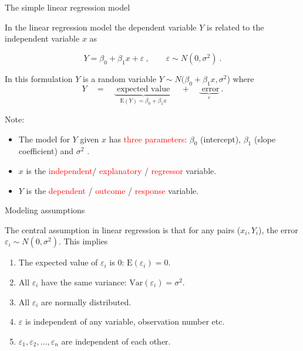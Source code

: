 \documentclass[10pt,ignorenonframetext,]{beamer}
\providecommand{\tightlist}{%
  \setlength{\itemsep}{0pt}\setlength{\parskip}{0pt}}
\begin{document}
\begin{frame}

\begin{block}{The simple linear regression model}

\vspace{3mm}

In the linear regression model the dependent variable \(Y\) is related
to the independent variable \(x\) as

\[Y = \beta_0 + \beta_1 x + \varepsilon \ , \qquad \varepsilon \sim N(0,\sigma^2) \ .\]
\vspace{2mm}

In this formulation \(Y\) is a random variable
\(Y \sim N(\beta_0 + \beta_1 x, \sigma^2\)) where
\[Y \quad= \quad \underbrace{\text{ expected value }}_{\text{E}(Y) = \beta_0 + \beta_1 x} \quad + \quad \underbrace{\text{ error}}_{\varepsilon}  \ .\]

Note:

\begin{itemize}
\tightlist
\item
  The model for \(Y\) given \(x\) has \textcolor{red}{three parameters}:
  \(\beta_0\) (intercept), \(\beta_1\) (slope coefficient) and
  \(\sigma^2\) .
\item
  \(x\) is the \textcolor{red}{independent}/
  \textcolor{red}{explanatory} / \textcolor{red}{regressor} variable.
\item
  \(Y\) is the \textcolor{red}{dependent} / \textcolor{red}{outcome} /
  \textcolor{red}{response} variable.
\end{itemize}

\end{block}

\end{frame}

\begin{frame}

\begin{block}{Modeling assumptions}

\vspace{4mm} The central assumption in linear regression is that for any
pairs (\(x_i,Y_i\)), the error \(\varepsilon_i \sim N(0,\sigma^2)\).
This implies \vspace{2mm}

\begin{enumerate}
\def\labelenumi{\alph{enumi})}
\item
  The expected value of \(\varepsilon_i\) is 0:
  \(\text{E}(\varepsilon_i)=0\).
\item
  All \(\varepsilon_i\) have the same variance:
  \(\text{Var}(\varepsilon_i)=\sigma^2\).
\item
  All \(\varepsilon_i\) are normally distributed.
\item
  \(\varepsilon\) is independent of any variable, observation number
  etc.
\item
  \(\varepsilon_1, \varepsilon_2, \ldots, \varepsilon_n\) are
  independent of each other.
\end{enumerate}

\end{block}

\end{frame}
\end{document}
